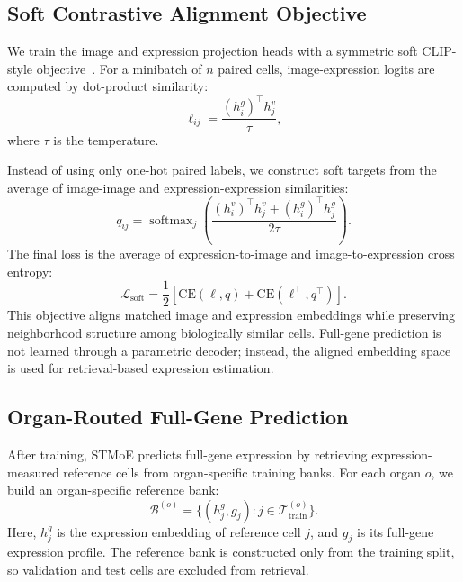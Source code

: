 \documentclass[sigconf]{acmart}
\newcommand{\method}{STMoE\xspace}
\begin{document}
\subsection{Soft Contrastive Alignment Objective}

We train the image and expression projection heads with a symmetric soft CLIP-style objective~\cite{radford2021clip,chen2020simclr,khosla2020supervised}. For a minibatch of $n$ paired cells, image-expression logits are computed by dot-product similarity:
\begin{equation}
    \ell_{ij} = \frac{(h_i^g)^\top h_j^v}{\tau},
\end{equation}
where $\tau$ is the temperature.

Instead of using only one-hot paired labels, we construct soft targets from the average of image-image and expression-expression similarities:
\begin{equation}
    q_{ij}
    =
    \operatorname{softmax}_{j}
    \left(
    \frac{(h_i^v)^\top h_j^v + (h_i^g)^\top h_j^g}{2\tau}
    \right).
\end{equation}
The final loss is the average of expression-to-image and image-to-expression cross entropy:
\begin{equation}
    \mathcal{L}_{\mathrm{soft}}
    =
    \frac{1}{2}
    \left[
    \mathrm{CE}(\ell, q)
    +
    \mathrm{CE}(\ell^\top, q^\top)
    \right].
\end{equation}
This objective aligns matched image and expression embeddings while preserving neighborhood structure among biologically similar cells. Full-gene prediction is not learned through a parametric decoder; instead, the aligned embedding space is used for retrieval-based expression estimation.

\subsection{Organ-Routed Full-Gene Prediction}

After training, \method{} predicts full-gene expression by retrieving expression-measured reference cells from organ-specific training banks. For each organ $o$, we build an organ-specific reference bank:
\begin{equation}
    \mathcal{B}^{(o)}
    =
    \{(h_j^g, g_j): j \in \mathcal{T}^{(o)}_{\mathrm{train}}\}.
\end{equation}
Here, $h_j^g$ is the expression embedding of reference cell $j$, and $g_j$ is its full-gene expression profile. The reference bank is constructed only from the training split, so validation and test cells are excluded from retrieval.
\end{document}
